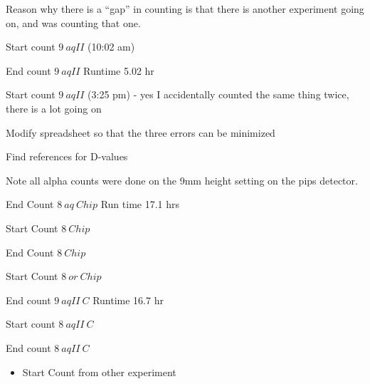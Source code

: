\documentclass[idxtotoc,hyperref,openany,oneside]{labbook} %
\newcommand{\cmark}{\ding{51}}%
\newcommand{\done}{\rlap{$\square$}{\raisebox{2pt}{\large\hspace{1pt}\cmark}}%
  \hspace{-2.5pt}}
\begin{document}
Reason why there is a ``gap'' in counting is that there
is another experiment going on, and was counting that one.
\begin{todolist}
\item[\done]{Start count $\boxed{9\ aqII}$ (10:02 am)}
\item[\done]{End count $\boxed{9\ aqII}$ Runtime 5.02 hr}
\item[\done]{Start count $\boxed{9\ aqII}$ (3:25 pm) -
  yes I accidentally counted the same thing twice, there is a lot
  going on}
\end{todolist}




\begin{todolist}
\item{Modify spreadsheet so that the three errors can
  be minimized}
\item{Find references for D-values}
\end{todolist}


Note all alpha counts were done on the 9mm height setting
on the pips detector.
\begin{todolist}
\item[\done]{End Count $\boxed{8\ aq\ Chip}$ Run time 17.1 hrs}
\item[\done]{Start Count $\boxed{8\ Chip}$}
\item[\done]{End Count $\boxed{8\ Chip}$}
\item[\done]{Start Count $\boxed{8\ or\ Chip}$}
\end{todolist}


\begin{todolist}
\item[\done]{End count $\boxed{9\ aqII\ C}$ Runtime 16.7 hr}
\item[\done]{Start count $\boxed{8\ aqII\ C}$}
\item[\done]{End count $\boxed{8\ aqII\ C}$}
  \begin{itemize}
  \item{Start Count from other experiment}
  \end{itemize}
\end{todolist}
\end{document}
